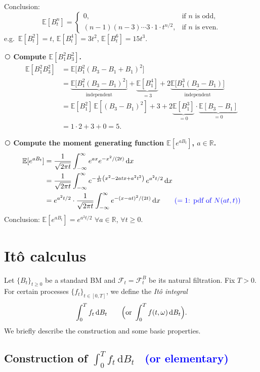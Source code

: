 \documentclass[11pt]{article}
\newcommand{\E}{\mathbb{E}}
\newcommand{\R}{\mathbb{R}}
\newcommand{\F}{\mathcal{F}}
\newcommand{\dd}{\,\mathrm{d}}
\newcommand{\cnum}[1]{\textcircled{\raisebox{-0.6pt}{\scriptsize #1}}} %
\newcommand{\ann}[1]{\textcolor{blue}{#1}}
\theoremstyle{definition}
\begin{document}
\noindent Conclusion:
\[
  \E[B_t^n]=
  \begin{cases}
    0, & \text{if $n$ is odd},\\[4pt]
    (n-1)(n-3)\cdots3\cdot1\cdot t^{n/2}, & \text{if $n$ is even}.
  \end{cases}
\]
e.g.\ $\E[B_t^2]=t$, \; $\E[B_t^4]=3t^2$, \; $\E[B_t^6]=15t^3$.

\medskip
\noindent\cnum{3} \textbf{Compute $\E[B_1^2B_3^2]$.}
\begin{align*}
  \E[B_1^2B_3^2]
    &= \E\bigl[B_1^2(B_3-B_1+B_1)^2\bigr]\\
    &= \underbrace{\E\bigl[B_1^2(B_3-B_1)^2\bigr]}_{\text{independent}}
       +\underbrace{\E[B_1^4]}_{=3}
       +2\underbrace{\E\bigl[B_1^3(B_3-B_1)\bigr]}_{\text{independent}}\\
    &= \E[B_1^2]\,\E[(B_3-B_1)^2]+3+2\underbrace{\E[B_1^3]}_{=0}\cdot\underbrace{\E[B_3-B_1]}_{=0}\\
    &= 1\cdot2+3+0=5 .
\end{align*}

\medskip
\noindent\cnum{4} \textbf{Compute the moment generating function $\E[e^{aB_t}]$, $a\in\R$.}
\begin{align*}
  \E[e^{aB_t}]
    &= \frac{1}{\sqrt{2\pi t}}\int_{-\infty}^{\infty}e^{ax}e^{-x^2/(2t)}\dd x\\
    &= \frac{1}{\sqrt{2\pi t}}\int_{-\infty}^{\infty}
       e^{-\frac{1}{2t}\left(x^2-2atx+a^2t^2\right)}\,e^{a^2t/2}\dd x\\
    &= e^{a^2t/2}\cdot\frac{1}{\sqrt{2\pi t}}\int_{-\infty}^{\infty}
       e^{-(x-at)^2/(2t)}\dd x
       \qquad \ann{\text{($=1$: pdf of $N(at,t)$)}}
\end{align*}
\noindent Conclusion: $\E[e^{aB_t}]=e^{a^2t/2}$ \quad $\forall a\in\R$, $\forall t\ge0$.

\section{It\^o calculus}

Let $\{B_t\}_{t\ge0}$ be a standard BM and $\F_t=\F_t^B$ be its natural filtration. Fix $T>0$.
For certain processes $\{f_t\}_{t\in[0,T]}$, we define the \emph{It\^o integral}
\[
  \int_0^Tf_t\dd B_t
  \qquad\Bigl(\text{or }\int_0^Tf(t,\omega)\dd B_t\Bigr).
\]
We briefly describe the construction and some basic properties.

\subsection*{Construction of $\int_0^Tf_t\dd B_t$ \ \ann{(or elementary)}}
\end{document}
